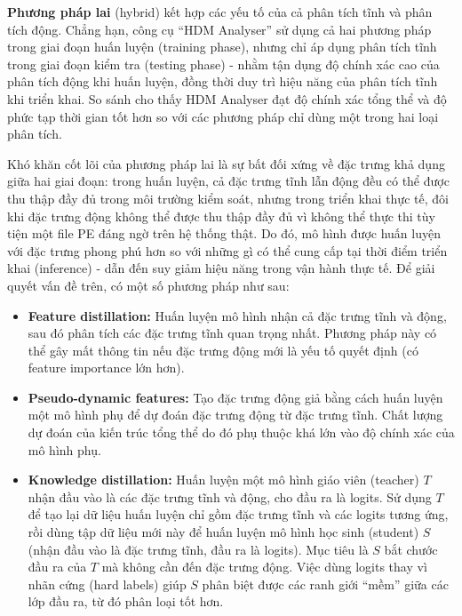 \textbf{Phương pháp lai} (hybrid) kết hợp các
yếu tố của cả phân tích tĩnh và phân tích động. Chẳng hạn, công cụ
``HDM Analyser'' \cite{singh2021survey, damodaran2017comparison} sử dụng cả hai phương pháp trong giai đoạn huấn luyện
(training phase), nhưng chỉ áp dụng phân tích tĩnh trong giai đoạn
kiểm tra (testing phase) - nhằm tận dụng độ chính xác cao của phân
tích động khi huấn luyện, đồng thời duy trì hiệu năng của phân tích
tĩnh khi triển khai. So sánh cho thấy HDM Analyser đạt độ chính xác
tổng thể và độ phức tạp thời gian tốt hơn so với các phương pháp chỉ
dùng một trong hai loại phân tích.

Khó khăn cốt lõi của phương pháp lai là sự bất đối xứng về đặc trưng
khả dụng giữa hai giai đoạn: trong huấn luyện, cả đặc trưng tĩnh lẫn
động đều có thể được thu thập đầy đủ trong môi trường kiểm soát, nhưng trong
triển khai thực tế, đôi khi đặc trưng động không thể được thu thập đầy đủ vì không thể thực
thi tùy tiện một file PE đáng ngờ trên hệ thống thật. Do đó, mô hình
được huấn luyện với đặc trưng phong phú hơn so với những gì có thể
cung cấp tại thời điểm triển khai (inference) - dẫn đến suy giảm hiệu năng
trong vận hành thực tế. Để giải quyết vấn đề trên, có một số phương pháp như sau:

\begin{itemize}
    \item \textbf{Feature distillation:} Huấn luyện mô hình nhận cả
        đặc trưng tĩnh và động, sau đó phân tích các đặc trưng tĩnh
        quan trọng nhất. Phương pháp này có thể gây mất thông tin nếu
        đặc trưng động mới là yếu tố quyết định (có feature importance
        lớn hơn).

    \item \textbf{Pseudo-dynamic features:} Tạo đặc trưng động giả
        bằng cách huấn luyện một mô hình phụ để dự đoán đặc trưng động
        từ đặc trưng tĩnh. Chất lượng dự đoán của kiến trúc tổng thể
        do đó phụ thuộc khá lớn vào độ chính xác của mô hình phụ.

    \item \textbf{Knowledge distillation:} Huấn luyện một mô hình giáo
        viên (teacher) $T$ nhận đầu vào là các đặc trưng tĩnh và động,
        cho đầu ra là logits. Sử dụng $T$ để tạo lại dữ liệu huấn luyện
        chỉ gồm đặc trưng tĩnh và các logits tương ứng, rồi dùng tập
        dữ liệu mới này để huấn luyện mô hình học sinh (student) $S$
        (nhận đầu vào là đặc trưng tĩnh, đầu ra là logits). Mục tiêu
        là $S$ bắt chước đầu ra của $T$ mà không cần đến đặc trưng
        động. Việc dùng logits thay vì nhãn cứng (hard labels) giúp $S$
        phân biệt được các ranh giới ``mềm'' giữa các lớp đầu ra, từ
        đó phân loại tốt hơn.
\end{itemize}

